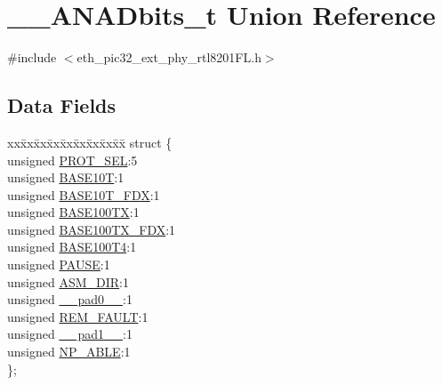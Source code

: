 \hypertarget{union_____a_n_a_dbits__t}{}\section{\+\_\+\+\_\+\+A\+N\+A\+Dbits\+\_\+t Union Reference}
\label{union_____a_n_a_dbits__t}


{\ttfamily \#include $<$eth\+\_\+pic32\+\_\+ext\+\_\+phy\+\_\+rtl8201\+F\+L.\+h$>$}

\subsection*{Data Fields}
\begin{DoxyCompactItemize}
\item 
\begin{tabbing}
xx\=xx\=xx\=xx\=xx\=xx\=xx\=xx\=xx\=\kill
struct \{\\
\>unsigned \hyperlink{union_____a_n_a_dbits__t_a05f4c23498c1cea5cfbfbbbc964f044b}{PROT\_SEL}:5\\
\>unsigned \hyperlink{union_____a_n_a_dbits__t_a19e0499585f3d54c98df590edff71b52}{BASE10T}:1\\
\>unsigned \hyperlink{union_____a_n_a_dbits__t_a60f1f5eeed205a15bb647dffff3a2ee3}{BASE10T\_FDX}:1\\
\>unsigned \hyperlink{union_____a_n_a_dbits__t_ad869e01954d2d35cb31bd254c50c44e1}{BASE100TX}:1\\
\>unsigned \hyperlink{union_____a_n_a_dbits__t_a62518f2f0d4bbb7e6f305cf513b7db56}{BASE100TX\_FDX}:1\\
\>unsigned \hyperlink{union_____a_n_a_dbits__t_ae7aa36d7ff2e31c4eb9726c67e04dfea}{BASE100T4}:1\\
\>unsigned \hyperlink{union_____a_n_a_dbits__t_ad4492e8a008bd744e8ee4a73bc202e78}{PAUSE}:1\\
\>unsigned \hyperlink{union_____a_n_a_dbits__t_a9ce4718733bcc9d125f46da36557d868}{ASM\_DIR}:1\\
\>unsigned \hyperlink{union_____a_n_a_dbits__t_adf71f3d8410c1f1dbbc96680a92c49af}{\_\_pad0\_\_}:1\\
\>unsigned \hyperlink{union_____a_n_a_dbits__t_acff720284bf641e0b589ea7feb2d3199}{REM\_FAULT}:1\\
\>unsigned \hyperlink{union_____a_n_a_dbits__t_acaf2d0924a107ec6e8d2e31febaf66f9}{\_\_pad1\_\_}:1\\
\>unsigned \hyperlink{union_____a_n_a_dbits__t_a4502f03b3664f0c1b02bfbfdae50f349}{NP\_ABLE}:1\\
\}; \\


\end{tabbing}
\end{DoxyCompactItemize}
